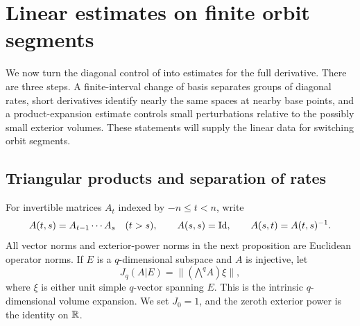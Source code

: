 \section{Linear estimates on finite orbit segments}\label{sec:linear}

We now turn the diagonal control of
 into estimates for the full derivative.
There are three steps.  A finite-interval change of basis separates
groups of diagonal rates, short derivatives identify nearly the same
spaces at nearby base points, and a product-expansion estimate controls
small perturbations relative to the possibly small exterior volumes.
These statements will supply the linear data for switching orbit
segments.

\subsection{Triangular products and separation of rates}

For invertible matrices $A_t$ indexed by $-n\leq t<n$, write
\[
 A(t,s)=A_{t-1}\cdots A_s\quad(t>s),\qquad
 A(s,s)=\mathrm{Id},\qquad A(s,t)=A(t,s)^{-1}.
\]
All vector norms and exterior-power norms in the next proposition are
Euclidean operator norms.  If $E$ is a $q$-dimensional subspace and
$A$ is injective, let
\[
 J_q(A|E)=\|(\mathord{\bigwedge}^q A)\xi\|,
\]
where $\xi$ is either unit simple $q$-vector spanning $E$.
This is the intrinsic $q$-dimensional volume expansion.  We set
$J_0=1$, and the zeroth exterior power is the identity on $\mathbb R$.

